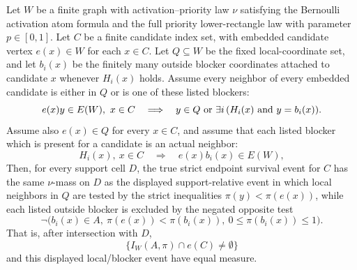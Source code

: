 \begin{helper}
Let \(W\) be a finite graph with activation--priority law \(\nu\) satisfying
the Bernoulli activation atom formula and the full priority lower-rectangle
law with parameter \(p\in[0,1]\).  Let \(C\) be a finite candidate index set,
with embedded candidate vertex \(e(x)\in W\) for each \(x\in C\).  Let
\(Q\subseteq W\) be the fixed local-coordinate set, and let
\(b_i(x)\) be the finitely many outside blocker coordinates attached to
candidate \(x\) whenever \(H_i(x)\) holds.  Assume every neighbor of every
embedded candidate is either in \(Q\) or is one of these listed blockers:
\[
  e(x)y\in E(W),\ x\in C
  \quad\Longrightarrow\quad
  y\in Q\ \hbox{or}\ \exists i\,(H_i(x)\hbox{ and }y=b_i(x)).
\]
Assume also \(e(x)\in Q\) for every \(x\in C\), and assume that each listed
blocker which is present for a candidate is an actual neighbor:
\[
  H_i(x),\ x\in C \quad\Longrightarrow\quad e(x)b_i(x)\in E(W),
\]
Then, for every support cell \(D\), the true strict endpoint survival event
for \(C\) has the same \(\nu\)-mass on \(D\) as the displayed
support-relative event in which local neighbors in \(Q\) are tested by the
strict inequalities \(\pi(y)<\pi(e(x))\), while each listed outside blocker
is excluded by the negated opposite test
\[
  \neg\bigl(b_i(x)\in A,\ \pi(e(x))<\pi(b_i(x)),\
  0\le \pi(b_i(x))\le1\bigr).
\]
That is, after intersection with \(D\),
\[
\{I_W(A,\pi)\cap e(C)\ne\emptyset\}
\]
and this displayed local/blocker event have equal measure.
\end{helper}
